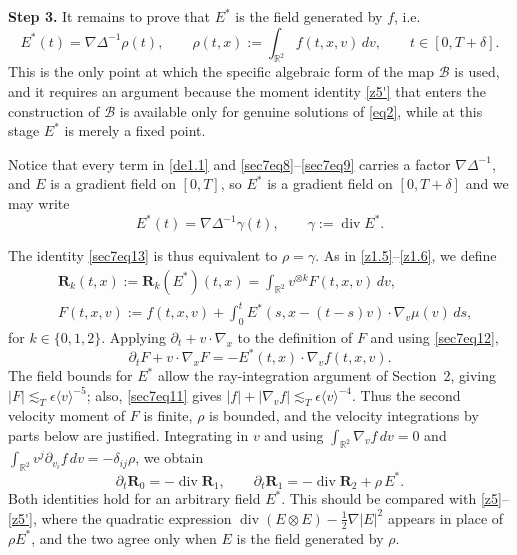 \documentclass[reqno,11pt]{amsart}
\numberwithin{equation}{section}
\def\R{{\mathbb R}}
\def\R{{\bf R}}
\def\R{\mathbb{R}}
\begin{document}
	{\bf{Step 3.}} It remains to prove that $E^\ast$ is the field generated by $f$,
	i.e.
	\begin{equation}\label{sec7eq13}
		E^\ast(t)=\nabla\Delta^{-1}\rho(t),\qquad
		\rho(t,x):=\int_{\R^2}f(t,x,v)\,dv,
		\qquad t\in[0,T+\delta].
	\end{equation}
	This is the only point at which the specific algebraic form of the map $\mathcal B$ is used,
	and it requires an argument because the moment identity \eqref{z5'} that enters the construction of
	$\mathcal B$ is available only for genuine solutions of \eqref{eq2}, while at this stage
	$E^\ast$ is merely a fixed point.

	Notice that every term in \eqref{de1.1} and \eqref{sec7eq8}--\eqref{sec7eq9} carries a factor
	$\nabla\Delta^{-1}$, and $E$ is a gradient field on $[0,T]$, so $E^\ast$ is a gradient
	field on $[0,T+\delta]$ and we may write
	\begin{equation}\label{sec7eq14}
		E^\ast(t)=\nabla\Delta^{-1}\gamma (t),
		\qquad
		\gamma:=\operatorname{div}E^\ast .
	\end{equation}
	
	The identity \eqref{sec7eq13} is thus equivalent to $\rho=\gamma$. As in \eqref{z1.5}--\eqref{z1.6}, we define
		\begin{equation}\label{sec7eq14.5}
		\begin{split}
		&\mathbf R_k(t,x):=\mathbf R_k(E^\ast)(t,x)=\int_{\R^2}v^{\otimes k}F(t,x,v)\,dv,\\
		&F(t,x,v):=f(t,x,v)+\int_0^tE^\ast(s,x-(t-s)v)\cdot\nabla_v\mu(v)\,ds,
		\end{split}
		\end{equation}
		for $k\in\{0,1,2\}$. Applying $\partial_t+v\cdot\nabla_x$ to the definition of $F$ and using \eqref{sec7eq12},
		\[
			\partial_tF+v\cdot\nabla_xF=-E^\ast(t,x)\cdot\nabla_vf(t,x,v).
		\]
\begingroup
The field bounds for $E^\ast$ allow the ray-integration argument
of Section~2, giving $|F|\lesssim_T\epsilon\langle v\rangle^{-5}$;
also, \eqref{sec7eq11} gives
$|f|+|\nabla_v f|\lesssim_T\epsilon\langle v\rangle^{-4}$.
Thus the second velocity moment of $F$ is finite, $\rho$ is bounded,
and the velocity integrations by parts below are justified.
\endgroup
		Integrating in $v$ and using
		$\int_{\R^2}\nabla_vf\,dv=0$ and $\int_{\R^2}v^j\partial_{v_i}f\,dv=-\delta_{ij}\rho$,
		we obtain
		\begin{equation}\label{sec7eq15}
			\partial_t\mathbf R_0=-\operatorname{div}\mathbf R_1,
			\qquad
			\partial_t\mathbf R_1=-\operatorname{div}\mathbf R_2+\rho\,E^\ast .
		\end{equation}
		Both identities hold for an arbitrary field $E^\ast$. This should be compared with
		\eqref{z5}--\eqref{z5'}, where the quadratic expression
		$\operatorname{div}(E\otimes E)-\frac12\nabla|E|^2$ appears in place of $\rho E^\ast$, and
		the two agree only when $E$ is the field generated by $\rho$.
\end{document}

